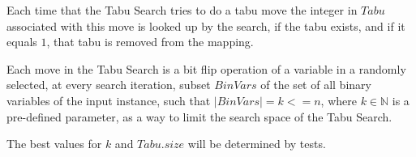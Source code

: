Each time that the Tabu Search tries to do a tabu move the integer in $Tabu$ associated with this move is looked up by the search, if the tabu exists, and if it equals $1$, that tabu is removed from the mapping.

Each move in the Tabu Search is a bit flip operation of a variable in a randomly selected, at every search iteration, subset $BinVars$ of the set of all binary variables of the input instance, such that $|BinVars| = k <= n$, where $k \in \mathbb{N}$ is a pre-defined parameter, as a way to limit the search space of the Tabu Search.

The best values for $k$ and $Tabu.size$ will be determined by tests.
